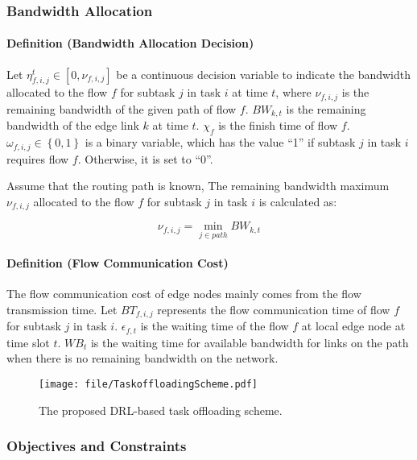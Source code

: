 \documentclass[10pt, conference, letterpaper]{IEEEtran}
\begin{document}
\subsubsection{Bandwidth Allocation}

\paragraph{Definition (Bandwidth Allocation Decision)} Let $\eta^t_{f,i,j} \in [0, \nu_{f,i,j}]$ be a continuous decision variable to indicate the bandwidth allocated to the flow $f$ for subtask $j$ in task $i$ at time $t$, where $\nu_{f,i,j}$ is the remaining bandwidth of the given path of flow $f$. $BW_{k,t}$ is the remaining bandwidth of the edge link $k$ at time $t$.
$\chi_f$ is the finish time of flow $f$. $\omega_{f,i,j} \in \left\{0,1\right\}$ is a binary variable, which has the value ``1'' if subtask $j$ in task $i$ requires flow $f$.
Otherwise, it is set to ``0''. 

Assume that the routing path is known, The remaining bandwidth maximum $\nu_{f,i,j}$ allocated to the flow $f$ for subtask $j$ in task $i$ is calculated as:

\begin{equation}
    \nu_{f,i,j} = \min_{j\in path} BW_{k,t}
\end{equation}

\paragraph{Definition (Flow Communication Cost)} The flow communication cost of edge nodes mainly comes from the flow transmission time. Let $BT_{f,i,j}$ represents the flow communication time of flow $f$ for subtask $j$ in task $i$. $\epsilon_{f,t}$ is the waiting time of the flow $f$ at local edge node at time slot $t$. $WB_t$ is the waiting time for available bandwidth for links on the path when there is no remaining bandwidth on the network.

\begin{figure}[t]
	\centering
    \texttt{[image: file/TaskoffloadingScheme.pdf]}
    \caption{The proposed DRL-based task offloading scheme.}
    \label{fig_taskoffloading}
\end{figure}

\subsubsection{Objectives and Constraints}
\end{document}
